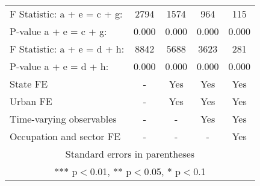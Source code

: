 \begin{tabular}{lcccc}
F Statistic: a + e = c  + g: & 2794 & 1574 & 964 & 115 \\
\hspace{1mm} P-value a + e = c + g: & 0.000 & 0.000 & 0.000 & 0.000 \\
F Statistic: a + e = d + h: & 8842 & 5688 & 3623 & 281 \\
\hspace{1mm} P-value a + e = d + h: & 0.000 & 0.000 & 0.000 & 0.000 \\
State FE & - & Yes & Yes & Yes \\
Urban FE & - & Yes & Yes & Yes \\
Time-varying observables & - & - & Yes & Yes \\
 Occupation and sector FE & - & - & - & Yes \\ \hline
\multicolumn{5}{c}{ Standard errors in parentheses} \\
\multicolumn{5}{c}{ *** p$<$0.01, ** p$<$0.05, * p$<$0.1} \\
\end{tabular}
